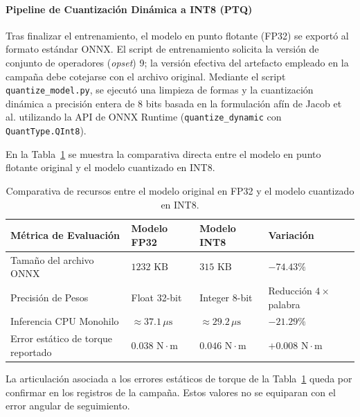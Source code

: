 \documentclass[12pt]{article}
\begin{document}
\paragraph{Pipeline de Cuantización Dinámica a INT8 (PTQ)}
Tras finalizar el entrenamiento, el modelo en punto flotante (FP32) se exportó al formato estándar ONNX. El script de entrenamiento solicita la versión de conjunto de operadores (\textit{opset}) 9; la versión efectiva del artefacto empleado en la campaña debe cotejarse con el archivo original. Mediante el script \texttt{quantize\_model.py}, se ejecutó una limpieza de formas y la cuantización dinámica a precisión entera de 8 bits basada en la formulación afín de Jacob et al. \cite{jacob2018quantization} utilizando la API de ONNX Runtime (\texttt{quantize\_dynamic} con \texttt{QuantType.QInt8}).

En la Tabla~\ref{tab:cuantizacion_comp} se muestra la comparativa directa entre el modelo en punto flotante original y el modelo cuantizado en INT8.

\begin{table}[htbp]
\centering
\footnotesize
\caption{Comparativa de recursos entre el modelo original en FP32 y el modelo cuantizado en INT8.}
\label{tab:cuantizacion_comp}
\begin{tabularx}{\textwidth}{>{\raggedright\arraybackslash}p{4.2cm} >{\centering\arraybackslash}p{2.6cm} >{\centering\arraybackslash}p{2.6cm} >{\raggedright\arraybackslash}X}
\toprule
\textbf{Métrica de Evaluación} & \textbf{Modelo FP32} & \textbf{Modelo INT8} & \textbf{Variación} \\
\midrule
Tamaño del archivo ONNX & $1232\text{ KB}$ & $315\text{ KB}$ & $\mathbf{-74.43\%}$ \\
Precisión de Pesos & Float 32-bit & Integer 8-bit & Reducción $4\times$ palabra \\
Inferencia CPU Monohilo & $\approx 37.1\,\mu\text{s}$ & $\approx 29.2\,\mu\text{s}$ & $\mathbf{-21.29\%}$ \\
Error estático de torque reportado & $0.038\text{ N}\cdot\text{m}$ & $0.046\text{ N}\cdot\text{m}$ & $+0.008\text{ N}\cdot\text{m}$ \\
\bottomrule
\end{tabularx}
\end{table}

La articulación asociada a los errores estáticos de torque de la Tabla~\ref{tab:cuantizacion_comp} queda por confirmar en los registros de la campaña. Estos valores no se equiparan con el error angular de seguimiento.
\end{document}
